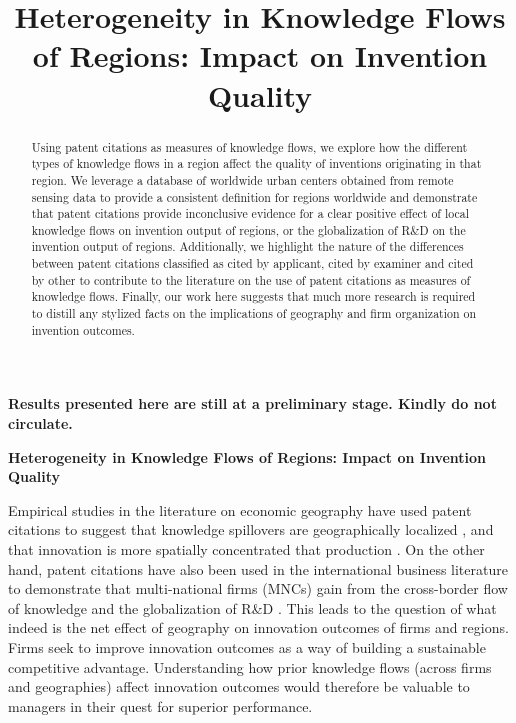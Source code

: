 \documentclass[12pt,letterpaper]{article}
\begin{document}

\setlength{\droptitle}{-5em}
\title{\textbf{\large Heterogeneity in Knowledge Flows of Regions: Impact on Invention Quality}}
\date{\vspace{-12ex}}

\maketitle
\thispagestyle{empty}
\renewcommand{\abstractname}{\normalsize ABSTRACT}
\begin{abstract}
\normalsize
\noindent Using patent citations as measures of knowledge flows, we explore how the different types of knowledge flows in a region affect the quality of inventions originating in that region. We leverage a database of worldwide urban centers  obtained from remote sensing data to provide a consistent definition for regions worldwide and demonstrate that patent citations provide inconclusive evidence for a clear positive effect of local knowledge flows on invention output of regions, or the globalization of R\&D on the invention output of regions. Additionally, we highlight the nature of the differences between patent citations classified as cited by applicant, cited by examiner and cited by other to contribute to the literature on the use of patent citations as measures of knowledge flows. Finally, our work here suggests that much more research is required to distill any stylized facts on the implications of geography and firm organization on invention outcomes. 
\end{abstract}
\vspace{30ex}
\textbf{Results presented here are still at a preliminary stage. Kindly do not circulate.}
\newpage
\pagestyle{fancy}
\fancyhf{}
\rhead{\thepage}

\textbf{Heterogeneity in Knowledge Flows of Regions: Impact on Invention Quality}

\vspace{3ex}


\noindent Empirical studies in the literature on economic geography have used patent citations to suggest that knowledge spillovers are geographically localized \citep*{Jaffe1993, Almeida1999, Branstetter2001, Sonn2008}, and that innovation is more spatially concentrated that production \citep{Feldman1994a}. On the other hand, patent citations have also been used in the international business literature to demonstrate that multi-national firms (MNCs) gain from the cross-border flow of knowledge and the globalization of R\&D \citep{Singh2007, Zhao2006, Singh2013}. This leads to the question of what indeed is the net effect of geography on innovation outcomes of firms and regions. Firms seek to improve innovation outcomes as a way of building a sustainable competitive advantage. Understanding how prior knowledge flows (across firms and geographies) affect innovation outcomes would therefore be valuable to managers in their quest for superior performance. \par
\end{document}
